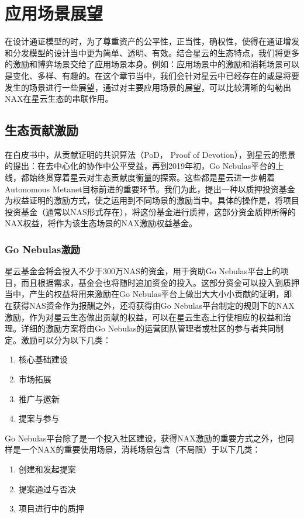 \section{应用场景展望}
在设计通证模型的时，为了尊重资产的公平性，正当性，确权性，使得在通证增发和分发模型的设计当中更为简单、透明、有效。结合星云的生态特点，我们将更多的激励和博弈场景交给了应用场景本身。例如：应用场景中的激励和消耗场景可以是变化、多样、有趣的。在这个章节当中，我们会针对星云中已经存在的或是将要发生的场景进行一些展望，通过对主要应用场景的展望，可以比较清晰的勾勒出NAX在星云生态的串联作用。

\subsection{生态贡献激励}
在白皮书中，从贡献证明的共识算法（PoD， Proof of Devotion），到星云的愿景的提出：在去中心化的协作中公平受益，再到2019年初，Go Nebulas平台的上线，都始终贯穿着星云对生态贡献度衡量的探索。这些都是星云进一步朝着Autonomous Metanet目标前进的重要环节。我们为此，提出一种以质押投资基金为权益证明的激励方式，使之运用到不同场景的激励当中。具体的操作是，将项目投资基金（通常以NAS形式存在），将这份基金进行质押，这部分资金质押所得的NAX权益，将作为该生态场景的NAX激励权益基金。

\subsubsection{Go Nebulas激励}
星云基金会将会投入不少于300万NAS的资金，用于资助Go Nebulas平台上的项目，而且根据需求，基金会也将随时追加资金的投入。这部分资金可以投入到质押当中，产生的权益将用来激励在Go Nebulas平台上做出大大小小贡献的证明，即在获得NAS资金作为报酬之外，还将获得由Go Nebulas平台制定的规则下的NAX激励，作为对星云生态做出贡献的权益，可以在星云生态上行使相应的权益和治理。详细的激励方案将由Go Nebulas的运营团队管理者或社区的参与者共同制定。激励可以分为以下几类：

\begin{enumerate}[\hspace{1cm}(a)]
  \item 核心基础建设
  \item 市场拓展
  \item 推广与邀新
  \item 提案与参与
\end{enumerate}

Go Nebulas平台除了是一个投入社区建设，获得NAX激励的重要方式之外，也同样是一个NAX的重要使用场景，消耗场景包含（不局限）于以下几类：
\begin{enumerate}[\hspace{1cm}(a)]
  \item 创建和发起提案
  \item 提案通过与否决
  \item 项目进行中的质押
\end{enumerate}


